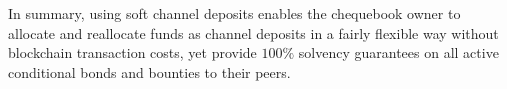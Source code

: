 In summary, using soft channel deposits enables the chequebook owner to allocate and reallocate funds
as channel deposits in a fairly flexible way without blockchain transaction costs,
yet provide $100\%$ solvency guarantees on all active conditional bonds and bounties to their peers.

% 
% 
% 
% 
% 
